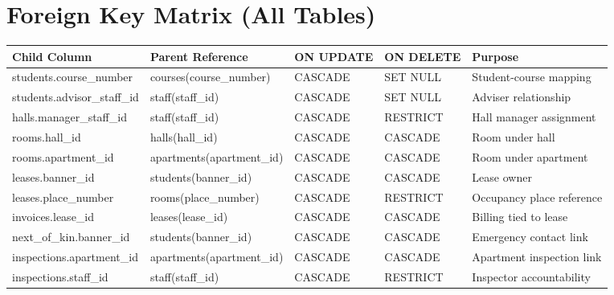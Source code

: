 \documentclass[11pt,a4paper]{article}
\begin{document}
\section{Foreign Key Matrix (All Tables)}
\begin{longtable}{>{\raggedright\arraybackslash}p{} >{\raggedright\arraybackslash}p{} >{\raggedright\arraybackslash}p{} >{\raggedright\arraybackslash}p{} >{\raggedright\arraybackslash}p{}}
\toprule
\textbf{Child Column} & \textbf{Parent Reference} & \textbf{ON UPDATE} & \textbf{ON DELETE} & \textbf{Purpose} \\
\midrule
\endhead
students.course\_number & courses(course\_number) & CASCADE & SET NULL & Student-course mapping \\
students.advisor\_staff\_id & staff(staff\_id) & CASCADE & SET NULL & Adviser relationship \\
halls.manager\_staff\_id & staff(staff\_id) & CASCADE & RESTRICT & Hall manager assignment \\
rooms.hall\_id & halls(hall\_id) & CASCADE & CASCADE & Room under hall \\
rooms.apartment\_id & apartments(apartment\_id) & CASCADE & CASCADE & Room under apartment \\
leases.banner\_id & students(banner\_id) & CASCADE & CASCADE & Lease owner \\
leases.place\_number & rooms(place\_number) & CASCADE & RESTRICT & Occupancy place reference \\
invoices.lease\_id & leases(lease\_id) & CASCADE & CASCADE & Billing tied to lease \\
next\_of\_kin.banner\_id & students(banner\_id) & CASCADE & CASCADE & Emergency contact link \\
inspections.apartment\_id & apartments(apartment\_id) & CASCADE & CASCADE & Apartment inspection link \\
inspections.staff\_id & staff(staff\_id) & CASCADE & RESTRICT & Inspector accountability \\
\bottomrule
\end{longtable}
\end{document}
